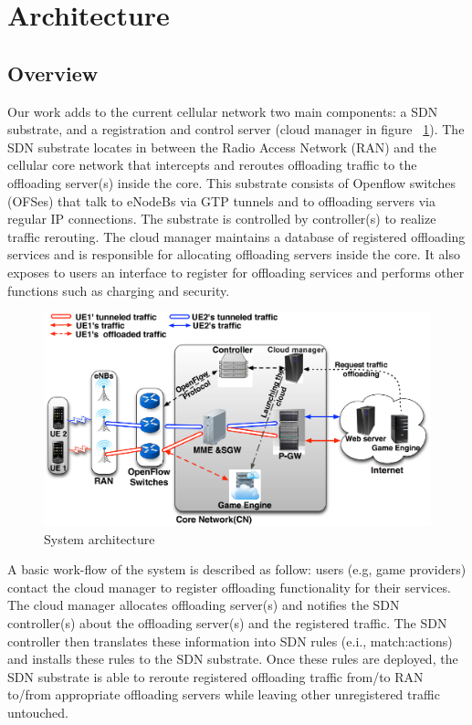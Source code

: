 
\section{Architecture}

\subsection{Overview}

Our work adds to the current cellular network two main components: a SDN substrate,   
and a registration and control server (cloud manager in figure ~\ref{fig:architecture}). 
The SDN substrate locates in between the Radio Access Network (RAN) 
and the cellular core network that intercepts and reroutes offloading traffic to the offloading 
server(s) inside the core. This substrate consists of Openflow switches (OFSes) 
that talk to eNodeBs via GTP tunnels and to offloading servers via regular 
IP connections. The substrate is controlled by controller(s) to
realize traffic rerouting. The cloud manager maintains a database of registered offloading services 
and is responsible for allocating offloading servers inside the core. It also exposes 
to users an interface to register for offloading services and performs other functions such as 
charging and security.

\begin{figure}[hbtp]
\centering
\includegraphics[scale=0.24]{./figure/architecture_mobi}
\caption{System architecture}
\label{fig:architecture}
\end{figure}

A basic work-flow of the system is described as follow: users (e.g, game providers) 
contact the cloud manager to register offloading functionality for their services. The cloud manager 
allocates offloading server(s) and notifies the SDN controller(s) about the offloading server(s) and the registered 
traffic. The SDN controller then translates these information into SDN rules 
(e.i., match:actions) and installs these rules to the SDN substrate. Once these rules are deployed, the SDN substrate 
is able to reroute registered offloading traffic from/to RAN to/from appropriate offloading servers 
while leaving other unregistered traffic untouched.



